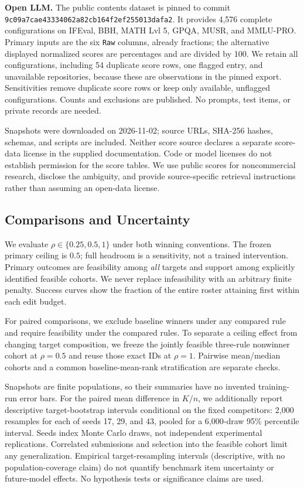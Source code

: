 \documentclass{article}
\begin{document}
\textbf{Open LLM.} The public contents dataset is pinned to commit \texttt{9c09a7cae43334062a82}\allowbreak\texttt{cb164f2ef255013dafa2}. It provides 4,576 complete configurations on IFEval, BBH, MATH Lvl 5, GPQA, MUSR, and MMLU-PRO. Primary inputs are the six \texttt{Raw} columns, already fractions; the alternative displayed normalized scores are percentages and are divided by 100. We retain all configurations, including 54 duplicate score rows, one flagged entry, and unavailable repositories, because these are observations in the pinned export. Sensitivities remove duplicate score rows or keep only available, unflagged configurations. Counts and exclusions are published. No prompts, test items, or private records are needed.

Snapshots were downloaded on 2026-11-02; source URLs, SHA-256 hashes, schemas, and scripts are included. Neither score source declares a separate score-data license in the supplied documentation. Code or model licenses do not establish permission for the score tables. We use public scores for noncommercial research, disclose the ambiguity, and provide source-specific retrieval instructions rather than assuming an open-data license.

\subsection{Comparisons and Uncertainty}
We evaluate $\rho\in\{0.25,0.5,1\}$ under both winning conventions. The frozen primary ceiling is $0.5$; full headroom is a sensitivity, not a trained intervention. Primary outcomes are feasibility among \emph{all} targets and support among explicitly identified feasible cohorts. We never replace infeasibility with an arbitrary finite penalty. Success curves show the fraction of the entire roster attaining first within each edit budget.

For paired comparisons, we exclude baseline winners under any compared rule and require feasibility under the compared rules. To separate a ceiling effect from changing target composition, we freeze the jointly feasible three-rule nonwinner cohort at $\rho=0.5$ and reuse those exact IDs at $\rho=1$. Pairwise mean/median cohorts and a common baseline-mean-rank stratification are separate checks.

Snapshots are finite populations, so their summaries have no invented training-run error bars. For the paired mean difference in $K/n$, we additionally report descriptive target-bootstrap intervals conditional on the fixed competitors: 2,000 resamples for each of seeds 17, 29, and 43, pooled for a 6,000-draw 95\% percentile interval. Seeds index Monte Carlo draws, not independent experimental replications. Correlated submissions and selection into the feasible cohort limit any generalization. Empirical target-resampling intervals (descriptive, with no population-coverage claim) do not quantify benchmark item uncertainty or future-model effects. No hypothesis tests or significance claims are used.
\end{document}
